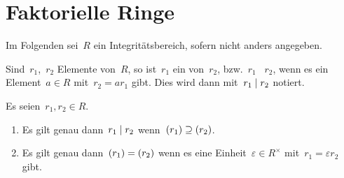 %
%





\section{Faktorielle Ringe}

\begin{convention}
  Im Folgenden sei~$R$ ein Integritätsbereich, sofern nicht anders angegeben.
\end{convention}

\begin{definition}
  Sind~$r_1$,~$r_2$ Elemente von~$R$, so ist~$r_1$ ein  von~$r_2$, bzw.~$r_1$ ~$r_2$, wenn es ein Element~$a \in R$ mit~$r_2 = a r_1$ gibt.
  Dies wird dann mit~$r_1 \mid r_2$ notiert.
\end{definition}

\begin{proposition}
  Es seien~$r_1, r_2 \in R$.
  \begin{enumerate}
    \item
      Es gilt genau dann~$r_1 \mid r_2$ wenn~$(r_1) \supseteq (r_2)$.
    \item
      Es gilt genau dann~$(r_1) = (r_2)$ wenn es eine Einheit~$\varepsilon \in R^\times$ mit~$r_1 = \varepsilon r_2$ gibt.
  \end{enumerate}
\end{proposition}

